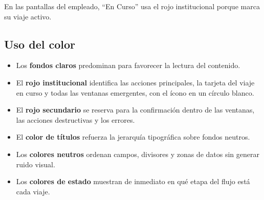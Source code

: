 \documentclass[11pt,letterpaper]{article}
\begin{document}
En las pantallas del empleado, ``En Curso'' usa el rojo institucional porque marca su viaje activo.

\subsection{Uso del color}
\begin{itemize}
  \item Los \textbf{fondos claros} predominan para favorecer la lectura del contenido.
  \item El \textbf{rojo institucional} identifica las acciones principales, la tarjeta del viaje en curso y todas las ventanas emergentes, con el ícono en un círculo blanco.
  \item El \textbf{rojo secundario} se reserva para la confirmación dentro de las ventanas, las acciones destructivas y los errores.
  \item El \textbf{color de títulos} refuerza la jerarquía tipográfica sobre fondos neutros.
  \item Los \textbf{colores neutros} ordenan campos, divisores y zonas de datos sin generar ruido visual.
  \item Los \textbf{colores de estado} muestran de inmediato en qué etapa del flujo está cada viaje.
\end{itemize}
\end{document}

